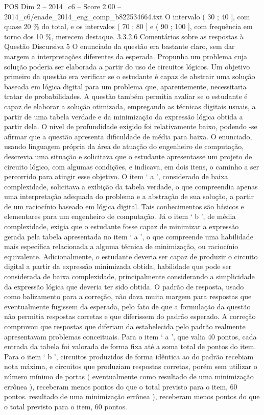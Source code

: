 \begin{textsample}{POS Dim 2 – 2014\_c6 – Score 2.00 – 2014\_c6/enade\_2014\_eng\_comp\_b822534664.txt}
O intervalo ( 30 ; 40 ], com quase 20 \% do total, e os intervalos ( 70 ; 80 ] e ( 90 ; 100 ], com frequência em torno dos 10 \%, merecem destaque. 3.3.2.6 Comentários sobre as respostas à Questão Discursiva 5 O enunciado da questão era bastante claro, sem dar margem a interpretações diferentes da esperada.
Propunha um problema cuja solução poderia ser elaborada a partir do uso de circuitos lógicos.
Um objetivo primeiro da questão era verificar se o estudante é capaz de abstrair uma solução baseada em lógica digital para um problema que, aparentemente, necessitaria tratar de probabilidades.
A questão também permitia avaliar se o estudante é capaz de elaborar a solução otimizada, empregando as técnicas digitais usuais, a partir de uma tabela verdade e da minimização da expressão lógica obtida a partir dela.
O nível de profundidade exigido foi relativamente baixo, podendo -se afirmar que a questão apresenta dificuldade de média para baixa.
O enunciado, usando linguagem própria da área de atuação do engenheiro de computação, descrevia uma situação e solicitava que o estudante apresentasse um projeto de circuito lógico, com algumas condições, e indicava, em dois itens, o caminho a ser percorrido para atingir esse objetivo.
O item ‘ a ’, considerado de baixa complexidade, solicitava a exibição da tabela verdade, o que compreendia apenas uma interpretação adequada do problema e a abstração de sua solução, a partir de um raciocínio baseado em lógica digital.
Tais conhecimentos são básicos e elementares para um engenheiro de computação.
Já o item ‘ b ’, de média complexidade, exigia que o estudante fosse capaz de minimizar a expressão gerada pela tabela apresentada no item ‘ a ’, o que compreende uma habilidade mais específica relacionada a alguma técnica de minimização, ou raciocínio equivalente.
Adicionalmente, o estudante deveria ser capaz de produzir o circuito digital a partir da expressão minimizada obtida, habilidade que pode ser considerada de baixa complexidade, principalmente considerando a simplicidade da expressão lógica que deveria ter sido obtida.
O padrão de resposta, usado como balizamento para a correção, não dava muita margem para respostas que eventualmente fugissem da esperada, pelo fato de que a formulação da questão não permitia respostas corretas e que diferissem do padrão esperado.
A correção comprovou que respostas que diferiam da estabelecida pelo padrão realmente apresentavam problemas conceituais.
Para o item ‘ a ’, que valia 40 pontos, cada entrada da tabela foi valorada de forma fixa até a soma total de pontos do item.
Para o item ‘ b ’, circuitos produzidos de forma idêntica ao do padrão recebiam nota máxima, e circuitos que produziam respostas corretas, porém sem utilizar o número mínimo de portas ( eventualmente como resultado de uma minimização errônea ), receberam menos pontos do que o total previsto para o item, 60 pontos. resultado de uma minimização errônea ), receberam menos pontos do que o total previsto para o item, 60 pontos.

\end{textsample}
